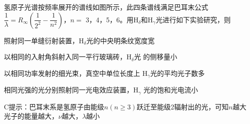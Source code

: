 氢原子光谱按频率展开的谱线如图所示，此四条谱线满足巴耳末公式\(\dfrac{1}{\lambda} = R_{\infty}(\dfrac{1}{2^2} - \dfrac{1}{n^2})\)，\(n =\) 3，4，5，6。用\(\mathrm{H}_{\delta}\)和\(\mathrm{H}_{\gamma}\)光进行如下实验研究，则\paren[C]

\begin{choices}
	\item 照射同一单缝衍射装置，\(\mathrm{H}_{\delta}\)光的中央明条纹宽度宽		
	\item 以相同的入射角斜射入同一平行玻璃砖，\(\mathrm{H}_{\delta}\)光	的侧移量小
	\item 以相同功率发射的细光束，真空中单位长度上
		\(\mathrm{H}_{\gamma}\)光的平均光子数多
	\item 相同光强的光分别照射同一光电效应装置，\(\mathrm{H}_{\gamma}\)	光的饱和光电流小
\end{choices}
\begin{answer}
    C\qquad 提示：巴耳末系是氢原子由能级\(n(n\ge 3)\)跃迁至能级2辐射出的光，可知\(n\)越大光子的能量越大，\(\nu\)越大，\(\lambda\)越小
\end{answer}